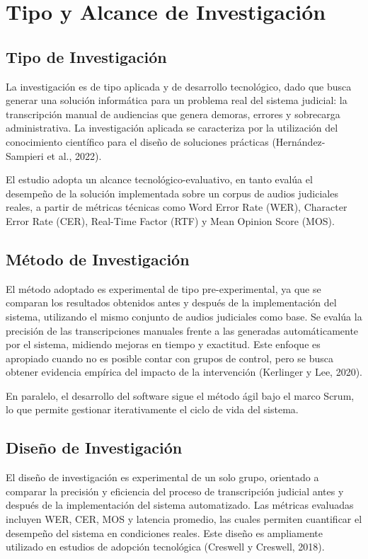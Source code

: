 \documentclass[12pt,a4paper,oneside]{report}
\begin{document}
\section{Tipo y Alcance de Investigación}

\subsection{Tipo de Investigación}

La investigación es de tipo aplicada y de desarrollo tecnológico, dado que busca generar una solución informática para un problema real del sistema judicial: la transcripción manual de audiencias que genera demoras, errores y sobrecarga administrativa. La investigación aplicada se caracteriza por la utilización del conocimiento científico para el diseño de soluciones prácticas (Hernández-Sampieri et al., 2022).

El estudio adopta un alcance tecnológico-evaluativo, en tanto evalúa el desempeño de la solución implementada sobre un corpus de audios judiciales reales, a partir de métricas técnicas como Word Error Rate (WER), Character Error Rate (CER), Real-Time Factor (RTF) y Mean Opinion Score (MOS).

\subsection{Método de Investigación}

El método adoptado es experimental de tipo pre-experimental, ya que se comparan los resultados obtenidos antes y después de la implementación del sistema, utilizando el mismo conjunto de audios judiciales como base. Se evalúa la precisión de las transcripciones manuales frente a las generadas automáticamente por el sistema, midiendo mejoras en tiempo y exactitud. Este enfoque es apropiado cuando no es posible contar con grupos de control, pero se busca obtener evidencia empírica del impacto de la intervención (Kerlinger y Lee, 2020).

En paralelo, el desarrollo del software sigue el método ágil bajo el marco Scrum, lo que permite gestionar iterativamente el ciclo de vida del sistema.

\subsection{Diseño de Investigación}

El diseño de investigación es experimental de un solo grupo, orientado a comparar la precisión y eficiencia del proceso de transcripción judicial antes y después de la implementación del sistema automatizado. Las métricas evaluadas incluyen WER, CER, MOS y latencia promedio, las cuales permiten cuantificar el desempeño del sistema en condiciones reales. Este diseño es ampliamente utilizado en estudios de adopción tecnológica (Creswell y Creswell, 2018).
\end{document}
